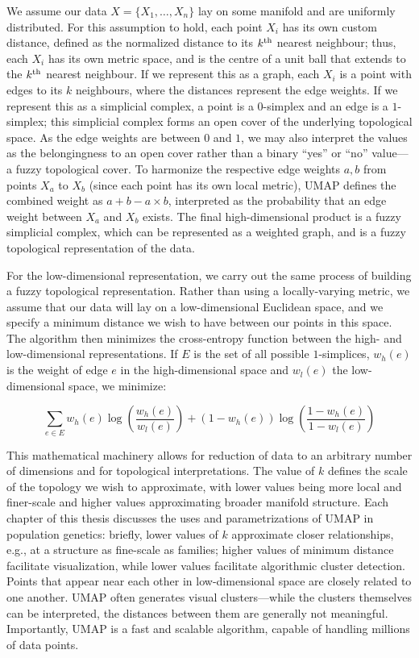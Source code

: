 We assume our data $X = \{X_{1}, \dots, X_{n}\}$ lay on some manifold and are uniformly distributed. For this assumption to hold, each point $X_{i}$ has its own custom distance, defined as the normalized distance to its $k\textsuperscript{th}$ nearest neighbour; thus, each $X_{i}$ has its own metric space, and is the centre of a unit ball that extends to the $k\textsuperscript{th}$ nearest neighbour. If we represent this as a graph, each $X_i$ is a point with edges to its $k$ neighbours, where the distances represent the edge weights. If we represent this as a simplicial complex, a point is a $0$-simplex and an edge is a $1$-simplex; this simplicial complex forms an open cover of the underlying topological space. As the edge weights are between $0$ and $1$, we may also interpret the values as the belongingness to an open cover rather than a binary ``yes'' or ``no'' value---a fuzzy topological cover. To harmonize the respective edge weights $a, b$ from points $X_{a}$ to $X_{b}$ (since each point has its own local metric), UMAP defines the combined weight as $a + b - a \times b$, interpreted as the probability that an edge weight between $X_{a}$ and $X_{b}$ exists. The final high-dimensional product is a fuzzy simplicial complex, which can be represented as a weighted graph, and is a fuzzy topological representation of the data.

For the low-dimensional representation, we carry out the same process of building a fuzzy topological representation. Rather than using a locally-varying metric, we assume that our data will lay on a low-dimensional Euclidean space, and we specify a minimum distance we wish to have between our points in this space. The algorithm then minimizes the cross-entropy function between the high- and low-dimensional representations. If $E$ is the set of all possible $1$-simplices, $w_{h}(e)$ is the weight of edge $e$ in the high-dimensional space and $w_{l}(e)$ the low-dimensional space, we minimize:

$$ \sum_{e \in E} w_{h}(e) \log{\left(\frac{w_{h}(e)}{w_{l}(e)}\right)} + (1 - w_{h}(e)) \log{\left(\frac{1 - w_{h}(e)}{1 - w_{l}(e)}\right)} $$

This mathematical machinery allows for reduction of data to an arbitrary number of dimensions and for topological interpretations. The value of $k$ defines the scale of the topology we wish to approximate, with lower values being more local and finer-scale and higher values approximating broader manifold structure. Each chapter of this thesis discusses the uses and parametrizations of UMAP in population genetics: briefly, lower values of $k$ approximate closer relationships, e.g., at a structure as fine-scale as families; higher values of minimum distance facilitate visualization, while lower values facilitate algorithmic cluster detection. Points that appear near each other in low-dimensional space are closely related to one another. UMAP often generates visual clusters---while the clusters themselves can be interpreted, the distances between them are generally not meaningful. Importantly, UMAP is a fast and scalable algorithm, capable of handling millions of data points.

